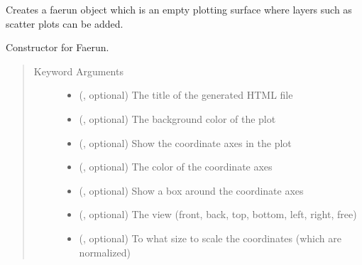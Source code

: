 \documentclass[letterpaper,10pt,english]{sphinxmanual}
\begin{document}
\begin{fulllineitems}
\label{\detokenize{documentation:faerun.Faerun}}
Creates a faerun object which is an empty plotting surface where
layers such as scatter plots can be added.

Constructor for Faerun.
\begin{quote}\begin{description}
\item[{Keyword Arguments}] \leavevmode\begin{itemize}
\item {} 
 (, optional) \textendash{} The title of the generated HTML file

\item {} 
 (, optional) \textendash{} The background color of the plot

\item {} 
 (, optional) \textendash{} Show the coordinate axes in the plot

\item {} 
 (, optional) \textendash{} The color of the coordinate axes

\item {} 
 (, optional) \textendash{} Show a box around the coordinate axes

\item {} 
 (, optional) \textendash{} The view (front, back, top, bottom, left, right, free)

\item {} 
 (, optional) \textendash{} To what size to scale the coordinates (which are normalized)


\end{itemize}
\end{description}
\end{quote}
\end{fulllineitems}
\end{document}
